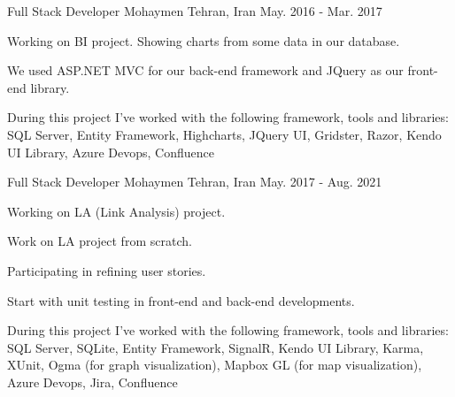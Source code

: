 

\begin{cventries}

  \cventry
    {Full Stack Developer} %
    {Mohaymen} %
    {Tehran, Iran} %
    {May. 2016 - Mar. 2017} %
    {
      \begin{cvitems} %
        \item {Working on BI project. Showing charts from some data in our database.}
        \item {We used ASP.NET MVC for our back-end framework and JQuery as our front-end library.}
        \item {During this project I've worked with the following framework, tools and libraries: SQL Server, Entity Framework, Highcharts, JQuery UI, Gridster, Razor, Kendo UI Library, Azure Devops, Confluence}
      \end{cvitems}
    }

\cventry
{Full Stack Developer} %
{Mohaymen} %
{Tehran, Iran} %
{May. 2017 - Aug. 2021} %
{
\begin{cvitems} %
	\item {Working on LA (Link Analysis) project.}
	\item {Work on LA project from scratch.}
	\item {Participating in refining user stories.}
	\item {Start with unit testing in front-end and back-end developments.}
	\item {During this project I've worked with the following framework, tools and libraries: SQL Server, SQLite, Entity Framework, SignalR, Kendo UI Library, Karma, XUnit, Ogma (for graph visualization), Mapbox GL (for map visualization), Azure Devops, Jira, Confluence}
\end{cvitems}
}



\end{cventries}
